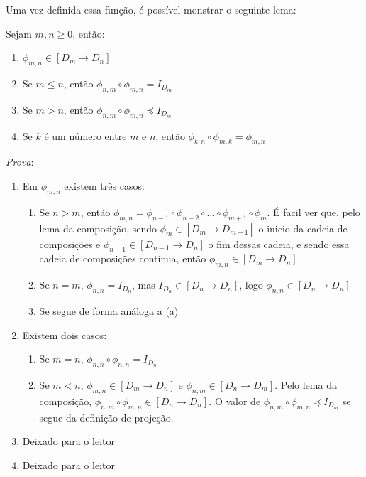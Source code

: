 \documentclass[../main.tex]{subfiles}
\begin{document}
Uma vez definida essa função, é possível monstrar o seguinte lema:

\begin{lemma}
    Sejam $m, n \geq 0$, então:
    \begin{enumerate}
        \item $\phi_{m,n} \in [D_m \to D_n]$
        \item Se $m \leq n$, então $\phi_{n, m} \circ \phi_{m,n} = I_{D_m}$
        \item Se $m > n$, então $\phi_{n, m} \circ \phi_{m,n} \preceq I_{D_m}$
        \item Se $k$ é um número entre $m$ e $n$, então $\phi_{k, n} \circ \phi_{m,k} = \phi_{m, n}$
    \end{enumerate}
\end{lemma}

\emph{Prova}: \begin{enumerate}
    \item Em $\phi_{m,n}$ existem três casos:
    \begin{enumerate}
        \item Se $n > m$, então $\phi_{m,n} = \phi_{n - 1} \circ \phi_{n - 2} \circ \dots \circ \phi_{m + 1} \circ \phi_{m}$. É facil ver que, pelo lema da composição, sendo $\phi_m \in [D_m \to D_{m+1}]$ o inicio da cadeia de composições e $\phi_{n-1} \in [D_{n-1} \to D_{n}]$ o fim dessas cadeia, e sendo essa cadeia de composições contínua, então $\phi_{m,n} \in [D_m \to D_n]$
        \item Se $n = m$, $\phi_{n,n} = I_{D_n}$, mas $I_{D_n} \in [D_n \to D_n]$, logo $\phi_{n,n} \in [D_n \to D_n]$
        \item Se segue de forma análoga a (a)
    \end{enumerate}
    \item Existem dois casos:
    \begin{enumerate}
        \item Se $m = n$, $\phi_{n,n} \circ \phi_{n,n} = I_{D_n}$
        \item Se $m < n$, $\phi_{m,n} \in [D_m \to D_n]$ e $\phi_{n,m} \in [D_n \to D_m]$. Pelo lema da composição, $\phi_{n, m} \circ \phi_{m,n} \in [D_n \to D_n]$. O valor de $\phi_{n, m} \circ \phi_{m,n} \preceq I_{D_m}$ se segue da definição de projeção.
    \end{enumerate}
    \item Deixado para o leitor \item Deixado para o leitor
\end{enumerate}
\end{document}
